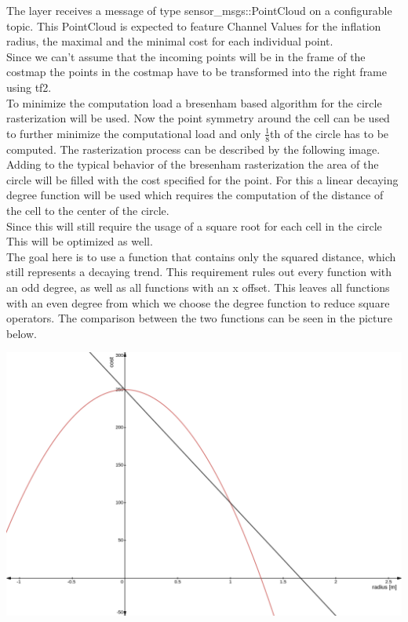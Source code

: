The layer receives a message of type sensor\_msgs::PointCloud on a configurable topic. This PointCloud is expected to feature Channel Values for the inflation radius, the maximal and the minimal cost for each individual point.\\

Since we can't assume that the incoming points will be in the frame of the costmap the points in the costmap have to be transformed into the right frame using tf2.\\

To minimize the computation load a bresenham based algorithm for the circle rasterization will be used. Now the point symmetry around the cell can be used to further minimize the computational load and only $\frac{1}{8}$th of the circle has to be computed. The rasterization process can be described by the following image.\\

Adding to the typical behavior of the bresenham rasterization the area of the circle will be filled with the cost specified for the point. For this a linear decaying  degree function will be used which requires the computation of the distance of the cell to the center of the circle.\\ Since this will still require the usage of a square root for each cell in the circle This will be optimized as well.\\

The goal here is to use a function that contains only the squared distance, which still represents a decaying trend. This requirement rules out every function with an odd degree, as well as all functions with an x offset. This leaves all functions with an even degree from which we choose the  degree function to reduce square operators. The comparison between the two functions can be seen in the picture below.

\center\includegraphics[width=140mm]{Pictures/linear cost comparison}



